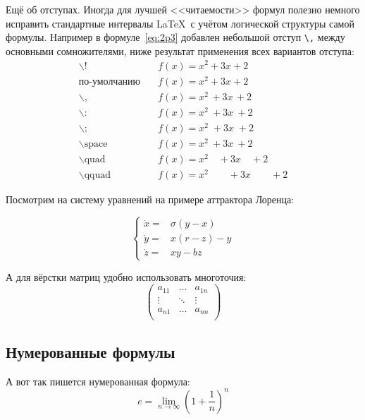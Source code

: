 Ещё об отступах.
Иногда для лучшей <<читаемости>> формул полезно немного исправить стандартные интервалы \LaTeX\ с учётом логической структуры самой формулы.
Например в формуле~\cref{eq:2p3} добавлен небольшой отступ \verb+\,+ между основными сомножителями, ниже результат применения всех вариантов отступа:
\begin{align*}
    \backslash!             & \quad f(x) = x^2\! +3x\! +2         \\
    \mbox{по-умолчанию}     & \quad f(x) = x^2+3x+2               \\
    \backslash,             & \quad f(x) = x^2\, +3x\, +2         \\
    \backslash{:}           & \quad f(x) = x^2\: +3x\: +2         \\
    \backslash;             & \quad f(x) = x^2\; +3x\; +2         \\
    \backslash \mbox{space} & \quad f(x) = x^2\ +3x\ +2           \\
    \backslash \mbox{quad}  & \quad f(x) = x^2\quad +3x\quad +2   \\
    \backslash \mbox{qquad} & \quad f(x) = x^2\qquad +3x\qquad +2
\end{align*}

Посмотрим на систему уравнений на примере аттрактора Лоренца:

\[
\left\{
\begin{array}{rl}
    \dot x = & \sigma (y-x)  \\
    \dot y = & x (r - z) - y \\
    \dot z = & xy - bz
\end{array}
\right.
\]

А для вёрстки матриц удобно использовать многоточия:
\[
    \left(
        \begin{array}{ccc}
            a_{11} & \ldots & a_{1n} \\
            \vdots & \ddots & \vdots \\
            a_{n1} & \ldots & a_{nn} \\
        \end{array}
    \right)
\]

\subsection{Нумерованные формулы}\label{subsec:ch1/sec3/sub3}

А вот так пишется нумерованная формула:
\begin{equation}
    \label{eq:equation1}
    e = \lim_{n \to \infty} \left( 1+\frac{1}{n} \right) ^n
\end{equation}


